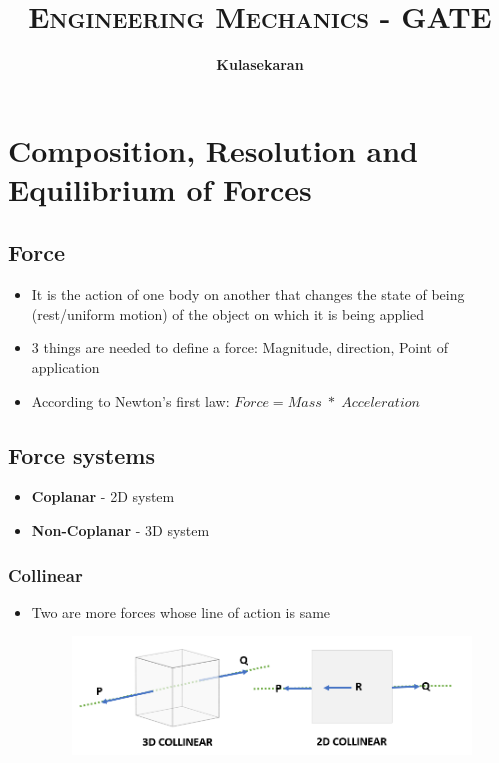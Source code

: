 \documentclass[8pt]{report}
\title{\Huge{\textsc{Engineering Mechanics - GATE}}}
\author{\huge{\textbf{Kulasekaran}}}
\begin{document}
\maketitle
\tableofcontents
\chapter{Composition, Resolution and Equilibrium of Forces}
\section{Force}
	\begin{itemize}
		\item It is the action of one body on another that changes the state of being (rest/uniform motion) of the object on which it is being applied
		\item 3 things are needed to define a force: Magnitude, direction, Point of application
		\item According to Newton's first law: $\boxed{Force = Mass\;*\;Acceleration}$
	\end{itemize}\hrulefill
\section{Force systems}
	\begin{itemize}
		\item \textbf{Coplanar} - 2D system
		\item \textbf{Non-Coplanar} - 3D system
	\end{itemize}
	\subsection{Collinear}
		\begin{itemize}
			\item Two are more forces whose line of action is same
			\begin{figure}[H]
				\centering
				\includegraphics[scale=0.5]{collinear.png}
			\end{figure}
		\end{itemize}
\end{document}
